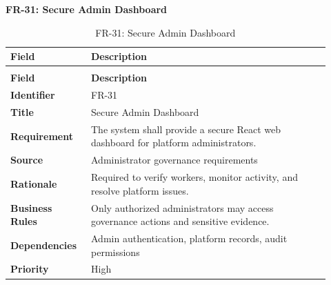 \documentclass[12pt,a4paper]{article}
\begin{document}
\noindent\textbf{FR-31: Secure Admin Dashboard}\par
\vspace{4pt}
\begingroup\small\setlength{\tabcolsep}{4pt}\renewcommand{\arraystretch}{1.15}
\begin{longtable}{|>{\raggedright\arraybackslash}p{0.22\linewidth}|>{\raggedright\arraybackslash}p{0.70\linewidth}|}
\caption{FR-31: Secure Admin Dashboard}\label{tab:fr-31}\\
\hline
\textbf{Field} & \textbf{Description} \\ \hline
\endfirsthead
\multicolumn{2}{c}{Table \thetable\ Secure Admin Dashboard (continued)}\\
\hline
\textbf{Field} & \textbf{Description} \\ \hline
\endhead
\textbf{Identifier} & FR-31 \\ \hline
\textbf{Title} & Secure Admin Dashboard \\ \hline
\textbf{Requirement} & The system shall provide a secure React web dashboard for platform administrators. \\ \hline
\textbf{Source} & Administrator governance requirements \\ \hline
\textbf{Rationale} & Required to verify workers, monitor activity, and resolve platform issues. \\ \hline
\textbf{Business Rules} & Only authorized administrators may access governance actions and sensitive evidence. \\ \hline
\textbf{Dependencies} & Admin authentication, platform records, audit permissions \\ \hline
\textbf{Priority} & High \\ \hline
\end{longtable}
\endgroup
\end{document}

